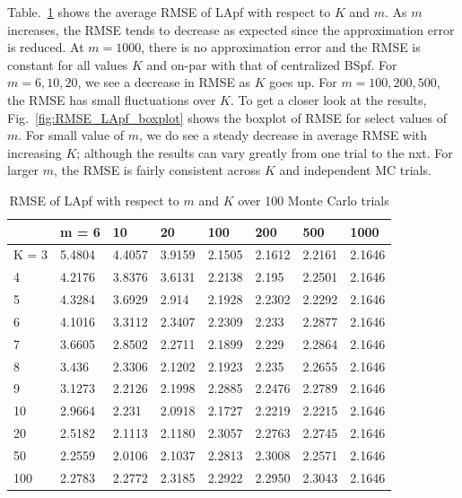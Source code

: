 \documentclass[10pt,letterpaper,final]{article}
\begin{document}
Table.~\ref{tab:RMSE_LApf} shows the average RMSE of LApf with respect to $K$ and $m$. As $m$ increases, the RMSE tends to decrease as expected since the approximation error is reduced.   At $m=1000$, there is no approximation error and the RMSE is constant for all values $K$ and on-par with that of centralized BSpf. For $m=6, 10, 20$, we see a decrease in RMSE as $K$ goes up.  For $m= 100, 200, 500$, the RMSE has small fluctuations over $K$. To get a closer look at the results, Fig.~\ref{fig:RMSE_LApf_boxplot} shows the boxplot of RMSE for select values of $m$. For small value of $m$, we do see a steady decrease in average RMSE with increasing $K$; although the results can vary greatly from one trial to the nxt. For larger $m$, the RMSE is fairly consistent across $K$ and independent MC trials. 

\begin{table}[h!]
\centering
\begin{tabular}{|l|l|l|l|l|l|l|l|}
\hline
        & m = 6  & 10     & 20     & 100    & 200    & 500    & 1000   \\ \hline
K = 3   & 5.4804 & 4.4057 & 3.9159 & 2.1505 & 2.1612 & 2.2161 & 2.1646 \\ \hline
4       & 4.2176 & 3.8376 & 3.6131 & 2.2138 & 2.195  & 2.2501 & 2.1646 \\ \hline
5       & 4.3284 & 3.6929 & 2.914  & 2.1928 & 2.2302 & 2.2292 & 2.1646 \\ \hline
6       & 4.1016 & 3.3112 & 2.3407 & 2.2309 & 2.233  & 2.2877 & 2.1646 \\ \hline
7       & 3.6605 & 2.8502 & 2.2711 & 2.1899 & 2.229  & 2.2864 & 2.1646 \\ \hline
8       & 3.436  & 2.3306 & 2.1202 & 2.1923 & 2.235  & 2.2655 & 2.1646 \\ \hline
9       & 3.1273 & 2.2126 & 2.1998 & 2.2885 & 2.2476 & 2.2789 & 2.1646 \\ \hline
10      & 2.9664 & 2.231  & 2.0918 & 2.1727 & 2.2219 & 2.2215 & 2.1646 \\ \hline
20      & 2.5182 & 2.1113 & 2.1180 & 2.3057 & 2.2763 & 2.2745    & 2.1646 \\ \hline
50      & 2.2559 & 2.0106 & 2.1037 & 2.2813 & 2.3008 & 2.2571    & 2.1646 \\ \hline
100     & 2.2783 & 2.2772 & 2.3185 & 2.2922 & 2.2950 & 2.3043    & 2.1646 \\ \hline
\end{tabular}
\caption{RMSE of LApf with respect to $m$ and $K$ over 100 Monte Carlo trials}
\label{tab:RMSE_LApf}
\end{table}
\end{document}
